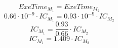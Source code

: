 \documentclass{article}
\newtheorem{domanda}{Domanda}[section]
\begin{document}
$$ExeTime_{M_1} = ExeTime_{M_2}$$
$$0.66 \cdot 10^{-9} \cdot IC_{M_1} = 0.93 \cdot 10^{-9} \cdot IC_{M_2}$$
$$IC_{M_1} = \frac{0.93}{0.66} \cdot IC_{M_2}$$
$$IC_{M_1} = 1.409 \cdot IC_{M_2}$$









\end{document}
